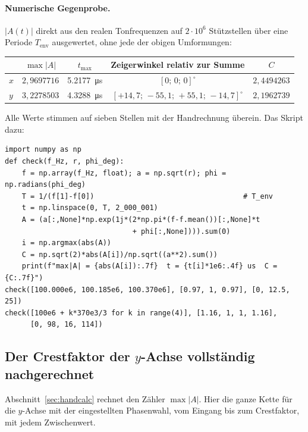 \documentclass[11pt,a4paper]{article}
\newcommand{\crest}{\ensuremath{C}}
\begin{document}
\paragraph{Numerische Gegenprobe.}
$|A(t)|$ direkt aus den realen Tonfrequenzen auf $2\cdot10^6$ Stützstellen
über eine Periode $T_\mathrm{env}$ ausgewertet, ohne jede der obigen
Umformungen:
\begin{center}
\begin{tabular}{@{}lcccc@{}}
  \toprule
  & $\max|A|$ & $t_\mathrm{max}$ & Zeigerwinkel relativ zur Summe & $\crest$\\
  \midrule
  $x$ & $2{,}9697716$ & \SI{5.2177}{\micro\second} & $[0;\,0;\,0]^\circ$ & $2{,}4494263$\\
  $y$ & $3{,}2278503$ & \SI{4.3288}{\micro\second} & $[+14{,}7;\,-55{,}1;\,+55{,}1;\,-14{,}7]^\circ$ & $2{,}1962739$\\
  \bottomrule
\end{tabular}
\end{center}
Alle Werte stimmen auf sieben Stellen mit der Handrechnung überein. Das
Skript dazu:
\begin{verbatim}
import numpy as np
def check(f_Hz, r, phi_deg):
    f = np.array(f_Hz, float); a = np.sqrt(r); phi = np.radians(phi_deg)
    T = 1/(f[1]-f[0])                                   # T_env
    t = np.linspace(0, T, 2_000_001)
    A = (a[:,None]*np.exp(1j*(2*np.pi*(f-f.mean())[:,None]*t
                              + phi[:,None]))).sum(0)
    i = np.argmax(abs(A))
    C = np.sqrt(2)*abs(A[i])/np.sqrt((a**2).sum())
    print(f"max|A| = {abs(A[i]):.7f}  t = {t[i]*1e6:.4f} us  C = {C:.7f}")
check([100.000e6, 100.185e6, 100.370e6], [0.97, 1, 0.97], [0, 12.5, 25])
check([100e6 + k*370e3/3 for k in range(4)], [1.16, 1, 1, 1.16],
      [0, 98, 16, 114])
\end{verbatim}

\subsection{Der Crestfaktor der \boldmath$y$-Achse vollständig nachgerechnet}
\label{sec:ycrest}

Abschnitt~\ref{sec:handcalc} rechnet den Zähler $\max|A|$. Hier die ganze
Kette für die $y$-Achse mit der eingestellten Phasenwahl, vom Eingang bis zum
Crestfaktor, mit jedem Zwischenwert.
\end{document}
